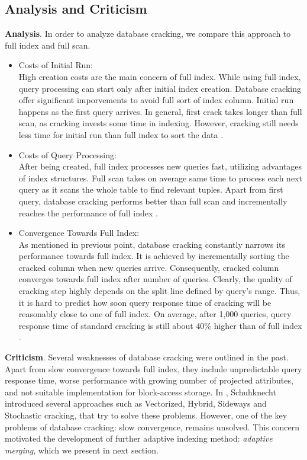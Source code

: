 \documentclass[10pt, conference, compsocconf]{IEEEtran}
\begin{document}
\subsection{Analysis and Criticism}
\textbf{Analysis}. In order to analyze database cracking, we compare this approach to full index and full scan.\\
\begin{itemize}
\item{Costs of Initial Run:} \\High creation costs are the main concern of full index. While using full index, query processing can start only after initial index creation. Database cracking offer significant imporvements to avoid full sort of index column. Initial run happens as the first query arrives. In general, first crack takes longer than full scan, as cracking invests some time in indexing. However, cracking still needs less time for initial run than full index to sort the data \cite{survey_cracking}.\\
\item{Costs of Query Processing:} \\After being created, full index processes new queries fast, utilizing advantages of index structures. Full scan takes on average same time to process each next query as it scans the whole table to find relevant tuples. Apart from first query, database cracking performs better than full scan and incrementally reaches the performance of full index \cite{survey_cracking}.\\
\item{Convergence Towards Full Index:} \\As mentioned in previous point, database cracking constantly narrows its performance towards full index. It is achieved by incrementally sorting the cracked column when new queries arrive. Consequently, cracked column converges towards full index after number of queries. Clearly, the quality of cracking step highly depends on the split line defined by query's range. Thus, it is hard to predict how soon query response time of cracking will be reasonably close to one of full index. On average, after 1,000 queries, query response time of standard cracking is still about 40\% higher than of full index \cite{eval2}.\\
\end{itemize}

\textbf{Criticism}. Several weaknesses of database cracking were outlined in the past. Apart from slow convergence towards full index, they include unpredictable query response time, worse performance with growing number of projected attributes, and not suitable implementation for block-access storage. In \cite{survey_cracking}, Schuhknecht introduced several approaches such as Vectorized, Hybrid, Sideways and Stochastic cracking, that try to solve these problems. However, one of the key problems of database cracking: slow convergence, remains unsolved. This concern motivated the development of further adaptive indexing method: \textit{adaptive merging}, which we present in next section.
\end{document}
